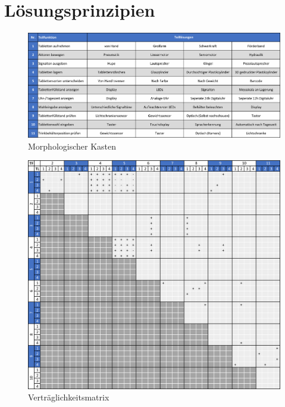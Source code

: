 \newpage
\section{Lösungsprinzipien}

\begin{figure}[H]
	\centering
	\includegraphics[width=1.0\linewidth]{chapter/Bilder/morphkasten}
	\caption{Morphologischer Kasten}
	\label{fig:morphkasten}
\end{figure}

\begin{figure}[H]
	\centering
	\includegraphics[width=1.0\linewidth]{chapter/Bilder/vertraeglichkeit}
	\caption{Verträglichkeitsmatrix}
	\label{fig:vertraglichkeit}
\end{figure}


